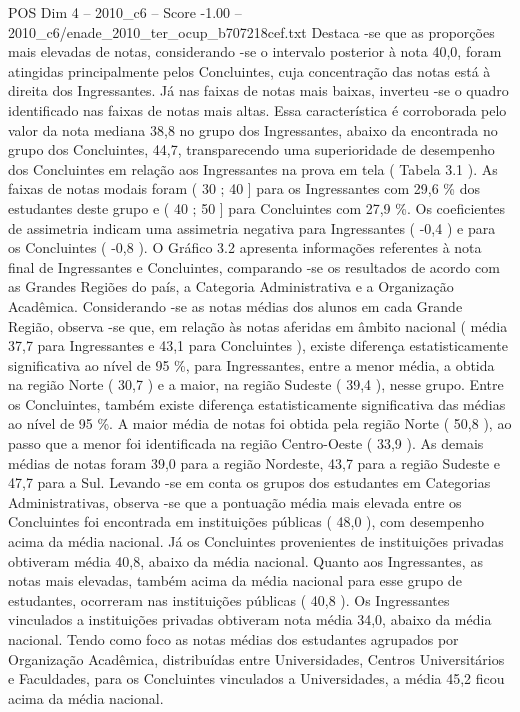 \begin{textsample}{POS Dim 4 – 2010\_c6 – Score -1.00 – 2010\_c6/enade\_2010\_ter\_ocup\_b707218cef.txt}
Destaca -se que as proporções mais elevadas de notas, considerando -se o intervalo posterior à nota 40,0, foram atingidas principalmente pelos Concluintes, cuja concentração das notas está à direita dos Ingressantes.
Já nas faixas de notas mais baixas, inverteu -se o quadro identificado nas faixas de notas mais altas.
Essa característica é corroborada pelo valor da nota mediana 38,8 no grupo dos Ingressantes, abaixo da encontrada no grupo dos Concluintes, 44,7, transparecendo uma superioridade de desempenho dos Concluintes em relação aos Ingressantes na prova em tela ( Tabela 3.1 ).
As faixas de notas modais foram ( 30 ; 40 ] para os Ingressantes com 29,6 \% dos estudantes deste grupo e ( 40 ; 50 ] para Concluintes com 27,9 \%.
Os coeficientes de assimetria indicam uma assimetria negativa para Ingressantes ( -0,4 ) e para os Concluintes ( -0,8 ).
O Gráfico 3.2 apresenta informações referentes à nota final de Ingressantes e Concluintes, comparando -se os resultados de acordo com as Grandes Regiões do país, a Categoria Administrativa e a Organização Acadêmica.
Considerando -se as notas médias dos alunos em cada Grande Região, observa -se que, em relação às notas aferidas em âmbito nacional ( média 37,7 para Ingressantes e 43,1 para Concluintes ), existe diferença estatisticamente significativa ao nível de 95 \%, para Ingressantes, entre a menor média, a obtida na região Norte ( 30,7 ) e a maior, na região Sudeste ( 39,4 ), nesse grupo.
Entre os Concluintes, também existe diferença estatisticamente significativa das médias ao nível de 95 \%.
A maior média de notas foi obtida pela região Norte ( 50,8 ), ao passo que a menor foi identificada na região Centro-Oeste ( 33,9 ).
As demais médias de notas foram 39,0 para a região Nordeste, 43,7 para a região Sudeste e 47,7 para a Sul.
Levando -se em conta os grupos dos estudantes em Categorias Administrativas, observa -se que a pontuação média mais elevada entre os Concluintes foi encontrada em instituições públicas ( 48,0 ), com desempenho acima da média nacional.
Já os Concluintes provenientes de instituições privadas obtiveram média 40,8, abaixo da média nacional.
Quanto aos Ingressantes, as notas mais elevadas, também acima da média nacional para esse grupo de estudantes, ocorreram nas instituições públicas ( 40,8 ).
Os Ingressantes vinculados a instituições privadas obtiveram nota média 34,0, abaixo da média nacional.
Tendo como foco as notas médias dos estudantes agrupados por Organização Acadêmica, distribuídas entre Universidades, Centros Universitários e Faculdades, para os Concluintes vinculados a Universidades, a média 45,2 ficou acima da média nacional.

\end{textsample}
